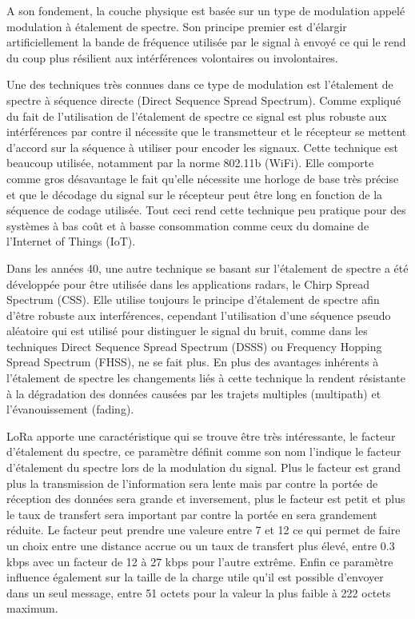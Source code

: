A son fondement, la couche physique est basée sur un type de modulation appelé modulation à étalement de spectre. Son principe premier est d'élargir artificiellement la bande de fréquence utilisée par le signal à envoyé ce qui le rend du coup plus résilient aux intérférences volontaires ou involontaires.

Une des techniques très connues dans ce type de modulation est l’étalement de spectre à séquence directe (Direct Sequence Spread Spectrum). Comme expliqué du fait de l'utilisation de l'étalement de spectre ce signal est plus robuste aux intérférences par contre il nécessite que le transmetteur et le récepteur se mettent d’accord sur la séquence à utiliser pour encoder les signaux. Cette technique est beaucoup utilisée, notamment par la norme 802.11b (WiFi). Elle comporte comme gros désavantage le fait qu’elle nécessite une horloge de base très précise et que le décodage du signal sur le récepteur peut être long en fonction de la séquence de codage utilisée. Tout ceci rend cette technique peu pratique pour des systèmes à bas coût et à basse consommation comme ceux du domaine de l’Internet of Things (IoT).

Dans les années 40, une autre technique se basant sur l’étalement de spectre a été développée pour être utilisée dans les applications radars, le Chirp Spread Spectrum (CSS). Elle utilise toujours le principe d’étalement de spectre afin d’être robuste aux interférences, cependant l’utilisation d’une séquence pseudo aléatoire qui est utilisé pour distinguer le signal du bruit, comme dans les techniques Direct Sequence Spread Spectrum (DSSS) ou Frequency Hopping Spread Spectrum (FHSS), ne se fait plus. En plus des avantages inhérents à l’étalement de spectre les changements liés à cette technique la rendent résistante à la dégradation des données causées par les trajets multiples (multipath) et l’évanouissement (fading). \cite{lora_modulation_basics}

LoRa apporte une caractéristique qui se trouve être très intéressante, le facteur d'étalement du spectre, ce paramètre définit comme son nom l'indique le facteur d'étalement du spectre lors de la modulation du signal. Plus le facteur est grand plus la transmission de l’information sera lente mais par contre la portée de réception des données sera grande et inversement, plus le facteur est petit et plus le taux de transfert sera important par contre la portée en sera grandement réduite. Le facteur peut prendre une valeure entre 7 et 12 ce qui permet de faire un choix entre une distance accrue ou un taux de transfert plus élevé, entre 0.3 kbps avec un facteur de 12 à 27 kbps pour l'autre extrême. Enfin ce paramètre influence également sur la taille de la charge utile qu'il est possible d'envoyer dans un seul message, entre 51 octets pour la valeur la plus faible à 222 octets maximum. \cite{limits_lorawan}







